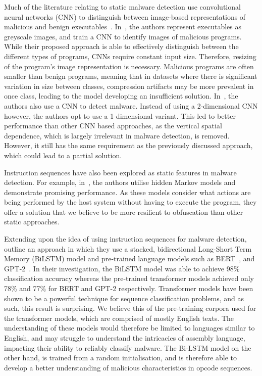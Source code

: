 \documentclass[conference,compsoc]{IEEEtran}
\begin{document}
Much of the literature relating to static malware detection use convolutional neural networks (CNN) to distinguish between image-based representations of malicious and benign executables~\cite{niMalwareIdentificationUsing2018,jainConvolutionalNeuralNetworks2020,habibiPerformanceEvaluationCNN2023}. In~\cite{aslanNewMalwareClassification2021}, the authors represent executables as greyscale images, and train a CNN to identify images of malicious programs. While their proposed approach is able to effectively distinguish between the different types of programs, CNNs require constant input size. Therefore, resizing of the program's image representation is necessary. Malicious programs are often smaller than benign programs, meaning that in datasets where there is significant variation in size between classes, compression artifacts may be more prevalent in once class, leading to the model developing an insufficient solution. In~\cite{sharmaMalwareDetectionUsing2019}, the authors also use a CNN to detect malware. Instead of using a 2-dimensional CNN however, the authors opt to use a 1-dimensional variant. This led to better performance than other CNN based approaches, as the vertical spatial dependence, which is largely irrelevant in malware detection, is removed. However, it still has the same requirement as the previously discussed approach, which could lead to a partial solution. 

Instruction sequences have also been explored as static features in malware detection. For example, in~\cite{attaluriProfileHiddenMarkov2009,runwalOpcodeGraphSimilarity2012}, the authors utilise hidden Markov models and demonstrate promising performance. As these models consider what actions are being performed by the host system without having to execute the program, they offer a solution that we believe to be more resilient to obfuscation than other static approaches. 

Extending upon the idea of using instruction sequences for malware detection,~\cite{demirciStaticMalwareDetection2022} outline an approach in which they use a stacked, bidirectional Long-Short Term Memory (BiLSTM) model and pre-trained language models such as BERT~\cite{devlinBERTPretrainingDeep2019a}, and GPT-2~\cite{radfordLanguageModelsAre2019}. In their investigation, the BiLSTM model was able to achieve 98\% classification accuracy whereas the pre-trained transformer models achieved only 78\% and 77\% for BERT and GPT-2 respectively. Transformer models have been shown to be a powerful technique for sequence classification problems, and as such, this result is surprising. We believe this of the pre-training corpora used for the transformer models, which are comprised of mostly English texts. The understanding of these models would therefore be limited to languages similar to English, and may struggle to understand the intricacies of assembly language, impacting their ability to reliably classify malware. The Bi-LSTM model on the other hand, is trained from a random initialisation, and is therefore able to develop a better understanding of malicious characteristics in opcode sequences.  
\end{document}
